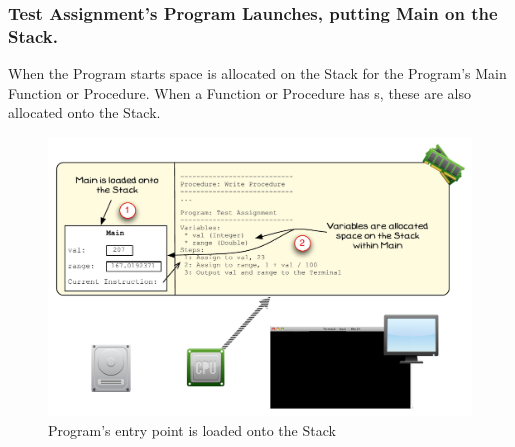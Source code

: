 \clearpage
\subsubsection{Test Assignment's Program Launches, putting Main on the Stack.} %
\label{ssub:test_assignment_s_program_launches_putting_main_on_the_stack_}

When the Program starts space is allocated on the Stack for the Program's Main Function or Procedure. When a Function or Procedure has s, these are also allocated onto the Stack.

\begin{figure}[htbp]
   \centering
   \includegraphics[width=\textwidth]{./topics/storing-using-data/images/vis-local-var-1} 
   \caption{Program's entry point is loaded onto the Stack}
   \label{fig:vis-data-local-1}
\end{figure}

